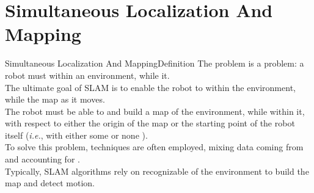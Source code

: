 
\section{Simultaneous Localization And Mapping}
\graphicspath{{figs/section4/}}

\begin{frame}{Simultaneous Localization And Mapping}{Definition}
	The  problem is a  problem: a robot must  within an environment, while  it.\\
	\bigskip
	The ultimate goal of SLAM is to enable the robot to  within the environment, while  the map as it moves.\\
	\bigskip
	The robot must be able to  and  build a map of the environment, while  within it, with respect to either the origin of the map or the starting point of the robot itself (\emph{i.e.}, with either some or none ).\\
	\bigskip
	To solve this problem,  techniques are often employed, mixing data coming from  and accounting for .\\
  \bigskip
  Typically, SLAM algorithms rely on recognizable  of the environment to build the map and detect motion.
\end{frame}
